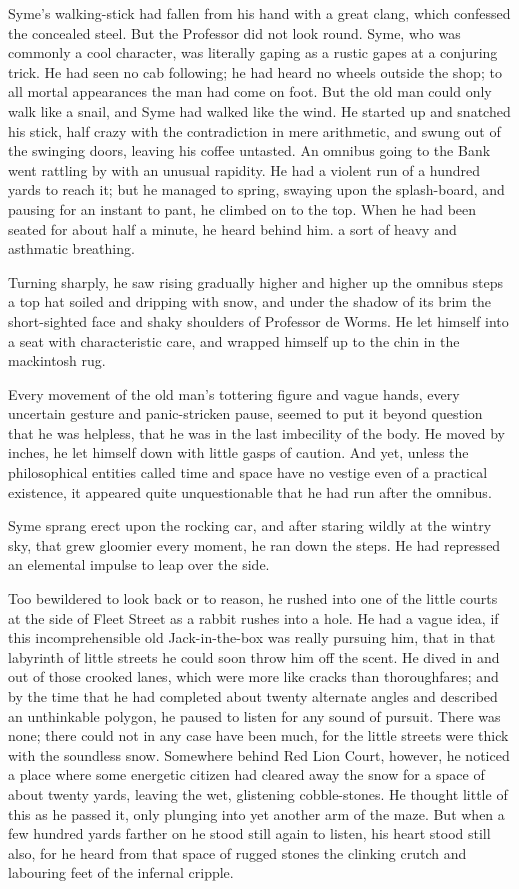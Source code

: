 \documentclass{book}
\begin{document}
Syme’s walking-stick had fallen from his hand with a great clang, which confessed the concealed steel. But the Professor did not look round. Syme, who was commonly a cool character, was literally gaping as a rustic gapes at a conjuring trick. He had seen no cab following; he had heard no wheels outside the shop; to all mortal appearances the man had come on foot. But the old man could only walk like a snail, and Syme had walked like the wind. He started up and snatched his stick, half crazy with the contradiction in mere arithmetic, and swung out of the swinging doors, leaving his coffee untasted. An omnibus going to the Bank went rattling by with an unusual rapidity. He had a violent run of a hundred yards to reach it; but he managed to spring, swaying upon the splash-board, and pausing for an instant to pant, he climbed on to the top. When he had been seated for about half a minute, he heard behind him. a sort of heavy and asthmatic breathing.

Turning sharply, he saw rising gradually higher and higher up the omnibus steps a top hat soiled and dripping with snow, and under the shadow of its brim the short-sighted face and shaky shoulders of Professor de Worms. He let himself into a seat with characteristic care, and wrapped himself up to the chin in the mackintosh rug.

Every movement of the old man’s tottering figure and vague hands, every uncertain gesture and panic-stricken pause, seemed to put it beyond question that he was helpless, that he was in the last imbecility of the body. He moved by inches, he let himself down with little gasps of caution. And yet, unless the philosophical entities called time and space have no vestige even of a practical existence, it appeared quite unquestionable that he had run after the omnibus.

Syme sprang erect upon the rocking car, and after staring wildly at the wintry sky, that grew gloomier every moment, he ran down the steps. He had repressed an elemental impulse to leap over the side.

Too bewildered to look back or to reason, he rushed into one of the little courts at the side of Fleet Street as a rabbit rushes into a hole. He had a vague idea, if this incomprehensible old Jack-in-the-box was really pursuing him, that in that labyrinth of little streets he could soon throw him off the scent. He dived in and out of those crooked lanes, which were more like cracks than thoroughfares; and by the time that he had completed about twenty alternate angles and described an unthinkable polygon, he paused to listen for any sound of pursuit. There was none; there could not in any case have been much, for the little streets were thick with the soundless snow. Somewhere behind Red Lion Court, however, he noticed a place where some energetic citizen had cleared away the snow for a space of about twenty yards, leaving the wet, glistening cobble-stones. He thought little of this as he passed it, only plunging into yet another arm of the maze. But when a few hundred yards farther on he stood still again to listen, his heart stood still also, for he heard from that space of rugged stones the clinking crutch and labouring feet of the infernal cripple.
\end{document}
